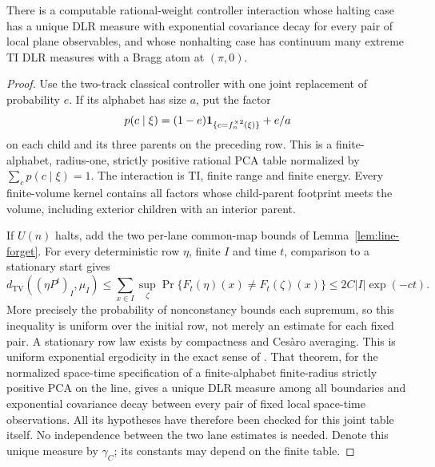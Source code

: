 \begin{lemma}\label{lem:line-gibbs-controller}
There is a computable rational-weight controller interaction whose
halting case has a unique DLR measure with exponential covariance
decay for every pair of local plane observables, and whose nonhalting
case has continuum many extreme TI DLR measures with a Bragg atom at
$(\pi,0)$.
\end{lemma}
\begin{proof}
Use the two-track classical controller with one joint replacement
of probability $e$. If its alphabet has size $a$, put the factor
\[
 p(c\mid\xi)=(1-e)\mathbf 1_{\{c=f_n^{\times2}(\xi)\}}+e/a
\]
on each child and its three parents on the preceding row.
This is a finite-alphabet, radius-one, strictly positive rational
PCA table normalized by $\sum_c p(c\mid\xi)=1$.
The interaction is TI, finite range and finite energy. Every
finite-volume kernel contains all factors whose child-parent
footprint meets the volume, including exterior children with an
interior parent.

If $U(n)$ halts, add the two per-lane common-map bounds of
Lemma~\ref{lem:line-forget}. For every deterministic row $\eta$,
finite $I$ and time $t$, comparison to a stationary start gives
\[
 d_{\mathrm{TV}}((\eta P^t)_I,\mu_I)
 \le \sum_{x\in I}\sup_\zeta
       \Pr\{F_t(\eta)(x)\ne F_t(\zeta)(x)\}
 \le 2C|I|\exp(-ct).
\]
More precisely the probability of nonconstancy bounds each supremum,
so this inequality is uniform over the initial row, not merely an
estimate for each fixed pair. A stationary row law exists by compactness
and Ces\`aro averaging. This is uniform exponential ergodicity in the
exact sense of \cite[Theorem~3.1]{DMspacetime}. That theorem, for the
normalized space-time specification of a finite-alphabet finite-radius
strictly positive PCA on the line, gives a unique DLR measure among
all boundaries and exponential covariance decay between every pair
of fixed local space-time observations. All its hypotheses have
therefore been checked for this joint table itself. No independence
between the two lane estimates is needed. Denote this unique measure
by $\gamma_C$; its constants may depend on the finite table.


\end{proof}
